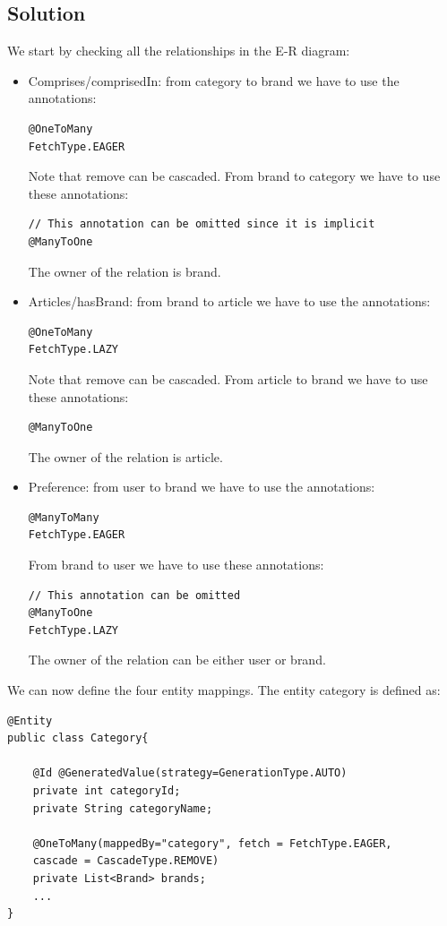 \subsection*{Solution}
We start by checking all the relationships in the E-R diagram: 
\begin{itemize}
    \item Comprises/comprisedIn: from category to brand we have to use the annotations: 
        \begin{lstlisting}[style=Java]
@OneToMany
FetchType.EAGER
        \end{lstlisting}
        Note that remove can be cascaded. 
        From brand to category we have to use these annotations: 
        \begin{lstlisting}[style=Java]
// This annotation can be omitted since it is implicit
@ManyToOne
        \end{lstlisting}
        The owner of the relation is brand. 
    \item Articles/hasBrand: from brand to article we have to use the annotations: 
        \begin{lstlisting}[style=Java]
@OneToMany
FetchType.LAZY
        \end{lstlisting}
        Note that remove can be cascaded. 
        From article to brand we have to use these annotations: 
        \begin{lstlisting}[style=Java]
@ManyToOne
        \end{lstlisting}
        The owner of the relation is article. 
    \item Preference: from user to brand we have to use the annotations: 
        \begin{lstlisting}[style=Java]
@ManyToMany
FetchType.EAGER
        \end{lstlisting}
        From brand to user we have to use these annotations: 
        \begin{lstlisting}[style=Java]
// This annotation can be omitted
@ManyToOne
FetchType.LAZY
        \end{lstlisting}
        The owner of the relation can be either user or brand. 
\end{itemize}
We can now define the four entity mappings. 
The entity category is defined as:  
\begin{lstlisting}[style=Java]
@Entity
public class Category{

    @Id @GeneratedValue(strategy=GenerationType.AUTO)
    private int categoryId;
    private String categoryName;

    @OneToMany(mappedBy="category", fetch = FetchType.EAGER,
    cascade = CascadeType.REMOVE)
    private List<Brand> brands;
    ...
}
\end{lstlisting}
